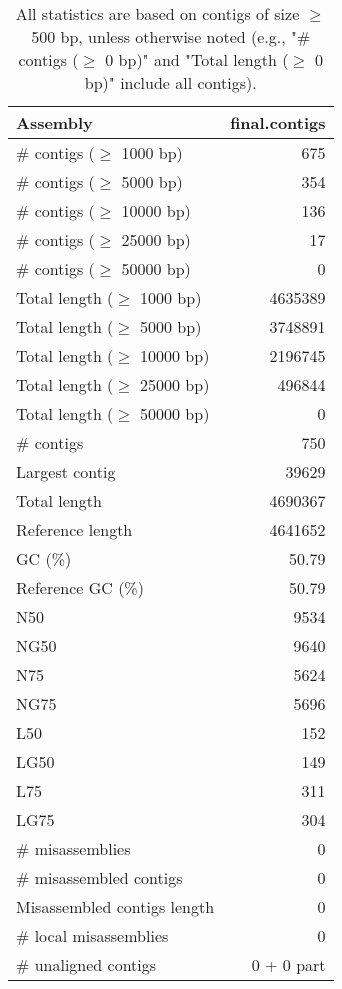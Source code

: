 \documentclass[12pt,a4paper]{article}
\begin{document}
\begin{table}[ht]
\begin{center}
\caption{All statistics are based on contigs of size $\geq$ 500 bp, unless otherwise noted (e.g., "\# contigs ($\geq$ 0 bp)" and "Total length ($\geq$ 0 bp)" include all contigs).}
\begin{tabular}{|l*{1}{|r}|}
\hline
Assembly & final.contigs \\ \hline
\# contigs ($\geq$ 1000 bp) & 675 \\ \hline
\# contigs ($\geq$ 5000 bp) & 354 \\ \hline
\# contigs ($\geq$ 10000 bp) & 136 \\ \hline
\# contigs ($\geq$ 25000 bp) & 17 \\ \hline
\# contigs ($\geq$ 50000 bp) & 0 \\ \hline
Total length ($\geq$ 1000 bp) & 4635389 \\ \hline
Total length ($\geq$ 5000 bp) & 3748891 \\ \hline
Total length ($\geq$ 10000 bp) & 2196745 \\ \hline
Total length ($\geq$ 25000 bp) & 496844 \\ \hline
Total length ($\geq$ 50000 bp) & 0 \\ \hline
\# contigs & 750 \\ \hline
Largest contig & 39629 \\ \hline
Total length & 4690367 \\ \hline
Reference length & 4641652 \\ \hline
GC (\%) & 50.79 \\ \hline
Reference GC (\%) & 50.79 \\ \hline
N50 & 9534 \\ \hline
NG50 & 9640 \\ \hline
N75 & 5624 \\ \hline
NG75 & 5696 \\ \hline
L50 & 152 \\ \hline
LG50 & 149 \\ \hline
L75 & 311 \\ \hline
LG75 & 304 \\ \hline
\# misassemblies & 0 \\ \hline
\# misassembled contigs & 0 \\ \hline
Misassembled contigs length & 0 \\ \hline
\# local misassemblies & 0 \\ \hline
\# unaligned contigs & 0 + 0 part \\ \hline

\end{tabular}
\end{center}
\end{table}
\end{document}

